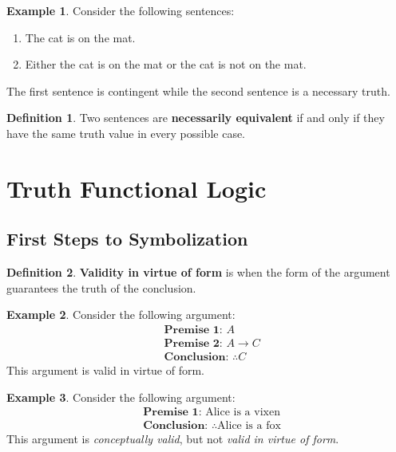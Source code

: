 \documentclass{tufte-handout}
\theoremstyle{definition}
\newtheorem{defn}{Definition}
\theoremstyle{example}
\newtheorem{exmp}{Example}
\theoremstyle{remark}
\begin{document}
\begin{exmp}
  Consider the following sentences:
  \begin{enumerate}[leftmargin=3\parindent]
    \item The cat is on the mat.
    \item Either the cat is on the mat or the cat is not on the mat.
  \end{enumerate}
  The first sentence is contingent while the second sentence is a necessary truth.
\end{exmp}
\begin{defn}
  Two sentences are \textbf{necessarily equivalent} if and only if they have the same truth value in every possible case.
\end{defn}
\newpage

\section{Truth Functional Logic}
\subsection{First Steps to Symbolization}
\begin{defn}
  \textbf{Validity in virtue of form} is when the form of the argument guarantees the truth of the conclusion.
\end{defn}
\begin{exmp}
  Consider the following argument:
  \begin{align*}
     & \textbf{Premise 1: } A             \\
     & \textbf{Premise 2: } A \to C       \\
     & \textbf{Conclusion: } \therefore C
  \end{align*}
  This argument is valid in virtue of form.
\end{exmp}
\begin{exmp}
  Consider the following argument:
  \begin{align*}
     & \textbf{Premise 1: } \text{Alice is a vixen}           \\
     & \textbf{Conclusion: } \therefore \text{Alice is a fox}
  \end{align*}
  This argument is \textit{conceptually valid}, but not \textit{valid in virtue of form}.
\end{exmp}
\end{document}
